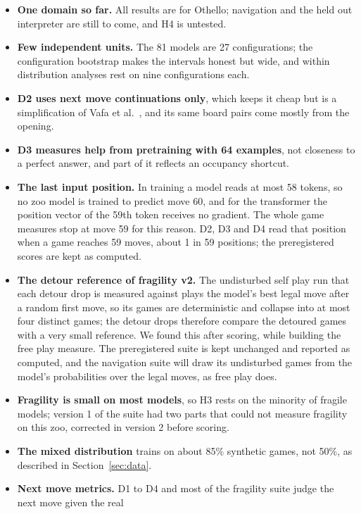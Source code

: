 \documentclass[11pt]{scrartcl}
\begin{document}
\begin{itemize}
    \item \textbf{One domain so far.} All results are for Othello; navigation and the held out interpreter are
    still to come, and H4 is untested.
    \item \textbf{Few independent units.} The 81 models are 27 configurations; the configuration bootstrap makes
    the intervals honest but wide, and within distribution analyses rest on nine configurations each.
    \item \textbf{D2 uses next move continuations only}, which keeps it cheap but is a simplification of Vafa et
    al.~\cite{vafa2024evaluating}, and its same board pairs come mostly from the opening.
    \item \textbf{D3 measures help from pretraining with 64 examples}, not closeness to a perfect answer, and
    part of it reflects an occupancy shortcut.
    \item \textbf{The last input position.} In training a model reads at most 58 tokens, so no zoo model is
    trained to predict move 60, and for the transformer the position vector of the 59th token receives no
    gradient. The whole game measures stop at move 59 for this reason. D2, D3 and D4 read that position when a
    game reaches 59 moves, about 1 in 59 positions; the preregistered scores are kept as computed.
    \item \textbf{The detour reference of fragility v2.} The undisturbed self play run that each detour drop is
    measured against plays the model's best legal move after a random first move, so its games are
    deterministic and collapse into at most four distinct games; the detour drops therefore compare the
    detoured games with a very small reference. We found this after scoring, while building the free play
    measure. The preregistered suite is kept unchanged and reported as computed, and the navigation suite will
    draw its undisturbed games from the model's probabilities over the legal moves, as free play does.
    \item \textbf{Fragility is small on most models}, so H3 rests on the minority of fragile models; version 1
    of the suite had two parts that could not measure fragility on this zoo, corrected in version 2 before
    scoring.
    \item \textbf{The mixed distribution} trains on about 85\% synthetic games, not 50\%, as described in
    Section~\ref{sec:data}.
    \item \textbf{Next move metrics.} D1 to D4 and most of the fragility suite judge the next move given the real

\end{itemize}
\end{document}
